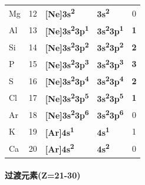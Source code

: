 {\begin{longtable}[]{@{}lcllc@{}}
Mg & 12 & \textbf{{[}Ne{]}3s\textsuperscript{2}} & \textbf{3s\textsuperscript{2}} & 0 \\
Al & 13 & \textbf{{[}Ne{]}3s\textsuperscript{2}3p\textsuperscript{1}} & \textbf{3s\textsuperscript{2}3p\textsuperscript{1}} & \textbf{1} \\
Si & 14 & \textbf{{[}Ne{]}3s\textsuperscript{2}3p\textsuperscript{2}} & \textbf{3s\textsuperscript{2}3p\textsuperscript{2}} & \textbf{2} \\
P & 15 & \textbf{{[}Ne{]}3s\textsuperscript{2}3p\textsuperscript{3}} & \textbf{3s\textsuperscript{2}3p\textsuperscript{3}} & \textbf{3} \\
S & 16 & \textbf{{[}Ne{]}3s\textsuperscript{2}3p\textsuperscript{4}} & \textbf{3s\textsuperscript{2}3p\textsuperscript{4}} & \textbf{2} \\
Cl & 17 & \textbf{{[}Ne{]}3s\textsuperscript{2}3p\textsuperscript{5}} & \textbf{3s\textsuperscript{2}3p\textsuperscript{5}} & \textbf{1} \\
Ar & 18 & \textbf{{[}Ne{]}3s\textsuperscript{2}3p\textsuperscript{6}} & \textbf{3s\textsuperscript{2}3p\textsuperscript{6}} & 0 \\
K & 19 & \textbf{{[}Ar{]}4s\textsuperscript{1}} & \textbf{4s\textsuperscript{1}} & 1 \\
Ca & 20 & \textbf{{[}Ar{]}4s\textsuperscript{2}} & \textbf{4s\textsuperscript{2}} & 0 \\
\end{longtable}
}

\paragraph{过渡元素(Z=21-30)}\label{ux8fc7ux6e21ux5143ux7d20z21-30}

